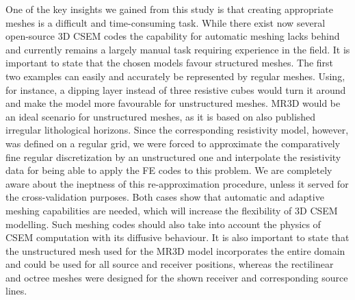 \documentclass[
    paper,
  ]{geophysics}
\begin{document}
One of the key insights we gained from this study is that creating appropriate meshes is a difficult and time-consuming task. While there exist now several open-source 3D CSEM codes the capability for automatic meshing lacks behind and currently remains a largely manual task requiring experience in the field. It is important to state that the chosen models favour structured meshes. The first two examples can easily and accurately be represented by regular meshes. Using, for instance, a dipping layer instead of three resistive cubes would turn it around and make the model more favourable for unstructured meshes. MR3D would be an ideal scenario for unstructured meshes, as it is based on also published irregular lithological horizons. Since the corresponding resistivity model, however, was defined on a regular grid, we were forced to approximate the comparatively fine regular discretization by an unstructured one and interpolate the resistivity data for being able to apply the FE codes to this problem. We are completely aware about the ineptness of this re-approximation procedure, unless it served for the cross-validation purposes. Both cases show that automatic and adaptive meshing capabilities are needed, which will increase the flexibility of 3D CSEM modelling. Such meshing codes should also take into account the physics of CSEM computation with its diffusive behaviour. It is also important to state that the unstructured mesh used for the MR3D model incorporates the entire domain and could be used for all source and receiver positions, whereas the rectilinear and octree meshes were designed for the shown receiver and corresponding source lines.
\end{document}
